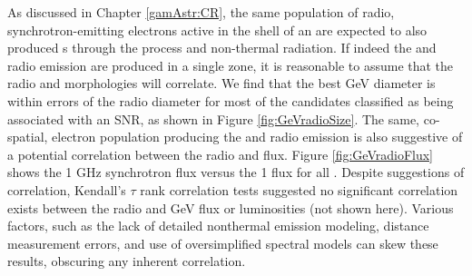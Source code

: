 As discussed in Chapter \ref{gamAstr:CR}, the same population of radio, synchrotron-emitting \cray{} electrons active in the shell of an \snr{} are expected to also produced \gam{}s through the \ic{} process and non-thermal \brems{} radiation. If indeed the\gev{} and radio emission are produced in a single zone, it is reasonable to assume that the radio and \gam{} morphologies will correlate. We find that the best GeV diameter is within errors of the radio diameter for most of the candidates classified as being associated with an SNR, as shown in Figure \ref{fig:GeVradioSize}. The same, co-spatial, electron population producing the\gev{} and radio emission is also suggestive of a potential correlation between the radio and \gam{} flux. Figure \ref{fig:GeVradioFlux} shows the 1 GHz synchrotron flux versus the 1\gev{} \gam{} flux for all \snrs{}. Despite suggestions of correlation, Kendall’s $\tau$ rank correlation tests suggested no significant correlation exists between the radio and GeV flux or luminosities (not shown here). Various factors, such as the lack of detailed nonthermal emission modeling, distance measurement errors, and use of oversimplified \gam{} spectral models can skew these results, obscuring any inherent correlation.

